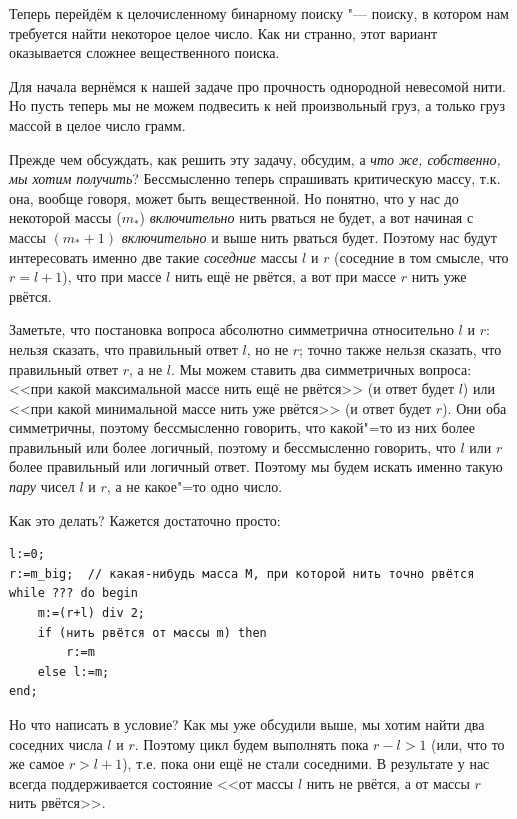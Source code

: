 \documentclass[a4paper,10pt]{problems}
\begin{document}
Теперь перейдём к целочисленному бинарному поиску "--- поиску, в котором нам требуется найти некоторое целое число. 
Как ни странно, этот вариант оказывается сложнее вещественного поиска.

 Для начала вернёмся к нашей задаче про прочность однородной невесомой нити. 
Но пусть теперь мы не можем подвесить к ней произвольный груз, а только груз массой в целое число грамм.

Прежде чем обсуждать, как решить эту задачу, обсудим, а \textit{что же, собственно, мы хотим получить}? 
Бессмысленно теперь спрашивать критическую массу, т.к. она, вообще говоря, может быть вещественной.
Но понятно, что у нас до некоторой массы ($m_*$) \textit{включительно} нить рваться не будет, а вот начиная с массы
$(m_*+1)$ \textit{включительно} и выше нить рваться будет. 
Поэтому нас будут интересовать именно две такие \textit{соседние} массы $l$ и $r$ (соседние в том смысле, 
что $r=l+1$), что при массе $l$ нить ещё не рвётся,
а вот при массе $r$ нить уже рвётся.

Заметьте, что постановка вопроса абсолютно симметрична относительно $l$ и $r$: нельзя сказать, что правильный ответ $l$, но не $r$; 
точно также нельзя сказать, что правильный ответ $r$, а не $l$. 
Мы можем ставить два симметричных вопроса: <<при какой максимальной массе нить ещё не рвётся>> (и ответ будет $l$)
или <<при какой минимальной массе нить уже рвётся>> (и ответ будет $r$).
Они оба симметричны, поэтому бессмысленно говорить, что какой"=то из них более правильный или более логичный, поэтому
и бессмысленно говорить, что $l$ или $r$ более правильный или логичный ответ. 
Поэтому мы будем искать именно такую \textit{пару} чисел $l$ и $r$, а не какое"=то одно число.

Как это делать? Кажется достаточно просто:
\begin{codesampleo}\begin{verbatim}
l:=0;
r:=m_big;  // какая-нибудь масса M, при которой нить точно рвётся
while ??? do begin    
    m:=(r+l) div 2;
    if (нить рвётся от массы m) then
        r:=m
    else l:=m;
end;
\end{verbatim}
\end{codesampleo}
Но что написать в условие? 
Как мы уже обсудили выше, мы хотим найти два соседних числа $l$ и $r$. 
Поэтому цикл будем выполнять пока $r-l>1$ (или, что то же самое $r>l+1$), т.е. пока они ещё не стали соседними.
В результате у нас всегда поддерживается состояние <<от массы $l$ нить не рвётся, а от массы $r$ нить рвётся>>.
\end{document}
